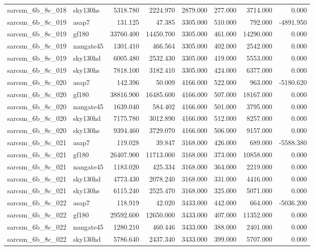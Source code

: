 \begin{tabular}{llrrrrrr}
sarcsm\_6b\_8c\_018 & sky130hs & 5318.780 & 2224.970 & 2879.000 & 277.000 & 3714.000 & 0.000 \\
sarcsm\_6b\_8c\_019 & asap7 & 131.125 & 47.385 & 3305.000 & 510.000 & 792.000 & -4891.950 \\
sarcsm\_6b\_8c\_019 & gf180 & 33760.400 & 14450.700 & 3305.000 & 461.000 & 14290.000 & 0.000 \\
sarcsm\_6b\_8c\_019 & nangate45 & 1301.410 & 466.564 & 3305.000 & 402.000 & 2542.000 & 0.000 \\
sarcsm\_6b\_8c\_019 & sky130hd & 6005.480 & 2532.430 & 3305.000 & 419.000 & 5553.000 & 0.000 \\
sarcsm\_6b\_8c\_019 & sky130hs & 7818.100 & 3182.410 & 3305.000 & 424.000 & 6377.000 & 0.000 \\
sarcsm\_6b\_8c\_020 & asap7 & 142.396 & 50.009 & 4166.000 & 522.000 & 963.000 & -5180.620 \\
sarcsm\_6b\_8c\_020 & gf180 & 38816.900 & 16485.600 & 4166.000 & 507.000 & 18167.000 & 0.000 \\
sarcsm\_6b\_8c\_020 & nangate45 & 1639.040 & 584.402 & 4166.000 & 501.000 & 3795.000 & 0.000 \\
sarcsm\_6b\_8c\_020 & sky130hd & 7175.780 & 3012.890 & 4166.000 & 512.000 & 8257.000 & 0.000 \\
sarcsm\_6b\_8c\_020 & sky130hs & 9394.460 & 3729.070 & 4166.000 & 506.000 & 9157.000 & 0.000 \\
sarcsm\_6b\_8c\_021 & asap7 & 119.028 & 39.847 & 3168.000 & 426.000 & 689.000 & -5588.380 \\
sarcsm\_6b\_8c\_021 & gf180 & 26407.900 & 11713.000 & 3168.000 & 373.000 & 10858.000 & 0.000 \\
sarcsm\_6b\_8c\_021 & nangate45 & 1183.020 & 425.334 & 3168.000 & 364.000 & 2219.000 & 0.000 \\
sarcsm\_6b\_8c\_021 & sky130hd & 4773.430 & 2078.240 & 3168.000 & 331.000 & 4416.000 & 0.000 \\
sarcsm\_6b\_8c\_021 & sky130hs & 6115.240 & 2525.470 & 3168.000 & 325.000 & 5071.000 & 0.000 \\
sarcsm\_6b\_8c\_022 & asap7 & 118.919 & 42.020 & 3433.000 & 442.000 & 664.000 & -5036.200 \\
sarcsm\_6b\_8c\_022 & gf180 & 29592.600 & 12650.000 & 3433.000 & 407.000 & 11352.000 & 0.000 \\
sarcsm\_6b\_8c\_022 & nangate45 & 1280.210 & 460.446 & 3433.000 & 388.000 & 2401.000 & 0.000 \\
sarcsm\_6b\_8c\_022 & sky130hd & 5786.640 & 2437.340 & 3433.000 & 399.000 & 5707.000 & 0.000 \\

\end{tabular}

